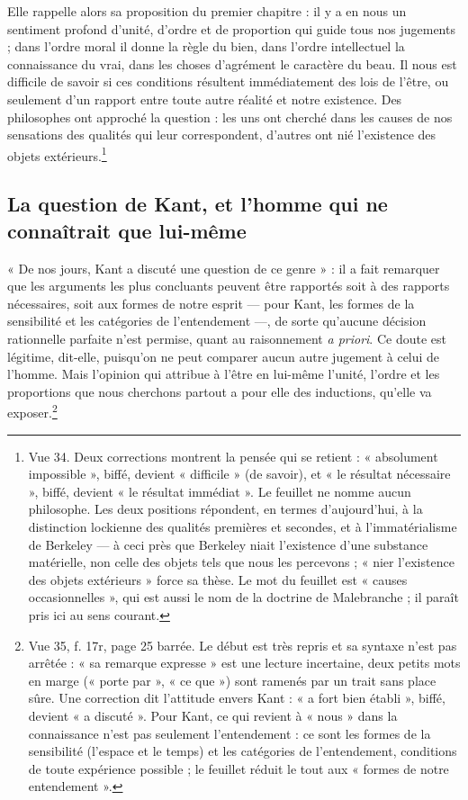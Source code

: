 \documentclass[11pt,a4paper]{article}
\begin{document}
Elle rappelle alors sa proposition du premier chapitre : il y a en nous un
sentiment profond d'unité, d'ordre et de proportion qui guide tous nos
jugements ; dans l'ordre moral il donne la règle du bien, dans l'ordre
intellectuel la connaissance du vrai, dans les choses d'agrément le caractère
du beau. Il nous est difficile de savoir si ces conditions résultent
immédiatement des lois de l'être, ou seulement d'un rapport entre toute autre
réalité et notre existence. Des philosophes ont approché la question : les uns
ont cherché dans les causes de nos sensations des qualités qui leur
correspondent, d'autres ont nié l'existence des objets
extérieurs.\footnote{Vue 34. Deux corrections montrent la pensée qui se
retient : « absolument impossible », biffé, devient « difficile » (de savoir),
et « le résultat nécessaire », biffé, devient « le résultat immédiat ». Le
feuillet ne nomme aucun philosophe. Les deux positions répondent, en termes
d'aujourd'hui, à la distinction lockienne des qualités premières et secondes,
et à l'immatérialisme de Berkeley — à ceci près que Berkeley niait l'existence
d'une substance matérielle, non celle des objets tels que nous les percevons ;
« nier l'existence des objets extérieurs » force sa thèse. Le mot du feuillet
est « causes occasionnelles », qui est aussi le nom de la doctrine de
Malebranche ; il paraît pris ici au sens courant.}

\subsection*{La question de Kant, et l'homme qui ne connaîtrait que lui-même}

« De nos jours, Kant a discuté une question de ce genre » : il a fait remarquer
que les arguments les plus concluants peuvent être rapportés soit à des
rapports nécessaires, soit aux formes de notre esprit — pour Kant, les formes de
la sensibilité et les catégories de l'entendement —, de sorte qu'aucune
décision rationnelle parfaite n'est permise, quant au raisonnement \emph{a
priori}. Ce doute est légitime, dit-elle, puisqu'on ne peut comparer aucun
autre jugement à celui de l'homme. Mais l'opinion qui attribue à l'être en
lui-même l'unité, l'ordre et les proportions que nous cherchons partout a pour
elle des inductions, qu'elle va exposer.\footnote{Vue 35, f. 17r, page 25
barrée. Le début est très repris et sa syntaxe n'est pas arrêtée : « sa
remarque expresse » est une lecture incertaine, deux petits mots en marge
(« porte par », « ce que ») sont ramenés par un trait sans place sûre. Une
correction dit l'attitude envers Kant : « a fort bien établi », biffé, devient
« a discuté ». Pour Kant, ce qui revient à « nous » dans la connaissance n'est
pas seulement l'entendement : ce sont les formes de la sensibilité (l'espace et
le temps) et les catégories de l'entendement, conditions de toute expérience
possible ; le feuillet réduit le tout aux « formes de notre entendement ».}
\end{document}
